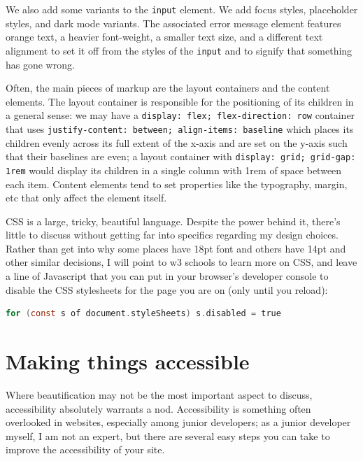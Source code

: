 \documentclass[11pt, twoside, reqno]{book}
\begin{document}
We also add some variants to the \texttt{input} element. We add focus styles, placeholder styles, and dark mode variants. The associated error message element features orange text, a heavier font-weight, a smaller text size, and a different text alignment to set it off from the styles of the \texttt{input} and to signify that something has gone wrong.

Often, the main pieces of markup are the layout containers and the content elements. The layout container is responsible for the positioning of its children in a general sense: we may have a \texttt{display: flex; flex-direction: row} container that uses \texttt{justify-content: between; align-items: baseline} which places its children evenly across its full extent of the x-axis and are set on the y-axis such that their baselines are even; a layout container with \texttt{display: grid; grid-gap: 1rem} would display its children in a single column with 1rem of space between each item. Content elements tend to set properties like the typography, margin, etc that only affect the element itself.

CSS is a large, tricky, beautiful language. Despite the power behind it, there's little to discuss without getting far into specifics regarding my design choices. Rather than get into why some places have 18pt font and others have 14pt and other similar decisions, I will point to w3 schools \cite{CSSTutor62:online} to learn more on CSS, and leave a line of Javascript that you can put in your browser's developer console to disable the CSS stylesheets for the page you are on (only until you reload):

\begin{lstlisting}[language=C]
for (const s of document.styleSheets) s.disabled = true
\end{lstlisting}

\section{Making things accessible}

Where beautification may not be the most important aspect to discuss, accessibility absolutely warrants a nod. Accessibility is something often overlooked in websites, especially among junior developers; as a junior developer myself, I am not an expert, but there are several easy steps you can take to improve the accessibility of your site.
\end{document}
